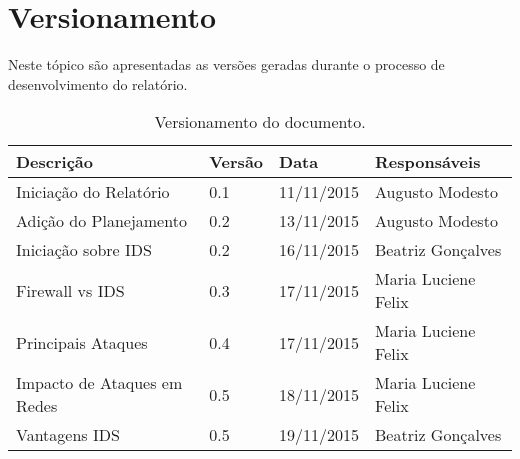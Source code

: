 \chapter[Versionamento]{Versionamento}
\label{chap:versionamento}
	Neste tópico são apresentadas as versões geradas durante o processo de desenvolvimento do relatório.
	
	\label{subsubsec:versionamento_talbe}
		\begin{table}[h]
			\centering
			\begin{tabular}{|p{6cm}|p{1.5cm}|p{2.5cm}|p{4cm}|}
				
				\hline
				
				Descrição & Versão & Data & Responsáveis \\ \hline
				Iniciação do Relatório & 0.1 & 11/11/2015 & Augusto Modesto \\ \hline
				Adição do Planejamento & 0.2 & 13/11/2015 & Augusto Modesto \\ \hline
				Iniciação sobre IDS & 0.2 & 16/11/2015 & Beatriz Gonçalves \\ \hline
				Firewall vs IDS & 0.3 & 17/11/2015 & Maria Luciene Felix \\ \hline
				Principais Ataques & 0.4 & 17/11/2015 & Maria Luciene Felix \\ \hline
				Impacto de Ataques em Redes & 0.5 & 18/11/2015 & Maria Luciene Felix \\ \hline
				Vantagens IDS & 0.5 & 19/11/2015 & Beatriz Gonçalves \\ \hline				




				
			\end{tabular}
			\caption[Versionamento do Documento]{Versionamento do documento.}
			\label{tab:versionamento_tabl}
		\end{table}
